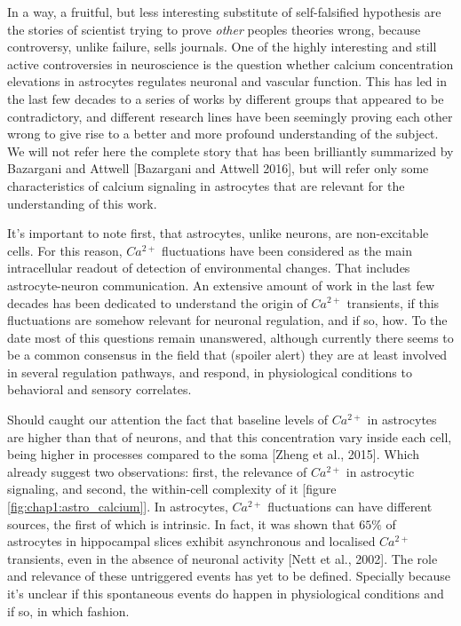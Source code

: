 In a way, a fruitful, but less interesting substitute of self-falsified hypothesis are the stories of scientist trying to prove \textit{other} peoples theories wrong, because controversy, unlike failure, sells journals.
One of the highly interesting and still active controversies in neuroscience is the question whether calcium concentration elevations in astrocytes regulates neuronal and vascular function.
This has led in the last few decades to a series of works by different groups that appeared to be contradictory, and different research lines have been seemingly proving each other wrong to give rise to a better and more profound understanding of the subject.  
We will not refer here the complete story that has been brilliantly summarized by Bazargani and Attwell [Bazargani and Attwell 2016], but will refer only some characteristics of calcium signaling in astrocytes that are relevant for the understanding of this work.

It's important to note first, that astrocytes, unlike neurons, are non-excitable cells.
For this reason, $Ca^{2+}$ fluctuations have been considered as the main intracellular readout of detection of environmental changes.
That includes astrocyte-neuron communication. 
An extensive amount of work in the last few decades has been dedicated to understand the origin of $Ca^{2+}$ transients, if this fluctuations are somehow relevant for neuronal regulation, and if so, how.
To the date most of this questions remain unanswered, although currently there seems to be a common consensus in the field that (spoiler alert) they are at least involved in several regulation pathways, and respond, in physiological conditions to behavioral and sensory correlates. 

Should caught our attention the fact that baseline levels of $Ca^{2+}$ in astrocytes are higher than that of neurons, and that this concentration vary inside each cell, being higher in processes compared to the soma [Zheng et al., 2015].
Which already suggest two observations: first, the relevance of $Ca^{2+}$ in astrocytic signaling, and second, the within-cell complexity of it [figure \ref{fig:chap1:astro_calcium}]. 
In astrocytes, $Ca^{2+}$ fluctuations can have different sources, the first of which is intrinsic. 
In fact, it was shown that $65\%$ of astrocytes in hippocampal slices exhibit asynchronous and localised $Ca^{2+}$ transients, even in the absence of neuronal activity [Nett et al., 2002].
The role and relevance of these untriggered events has yet to be defined. 
Specially because it's unclear if this spontaneous events do happen in physiological conditions and if so, in which fashion. 

